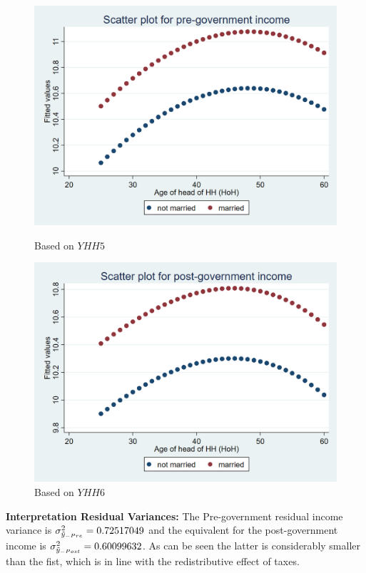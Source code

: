 \documentclass[12pt,a4paper]{article}
\begin{document}
\begin{figure}[h]
  \centering
  \begin{minipage}[b]{0.45\textwidth}
    \includegraphics[width=\textwidth]{stata_output/smoothed_yy5B_hat.png}
    \caption{Based on $YHH5$}
  \end{minipage}
  \hfill
  \begin{minipage}[b]{0.45\textwidth}
    \includegraphics[width=\textwidth]{stata_output/smoothed_yy6B_hat.png}
    \caption{Based on $YHH6$}
  \end{minipage}
\end{figure}

\textbf{Interpretation Residual Variances:} The Pre-government residual income variance is $\sigma^2_{\Tilde{y}_{-Pre}} = 0.72517049$ and the equivalent for the post-government income is $\sigma^2_{\Tilde{y}_{-Post}} = 0.60099632$. As can be seen the latter is considerably smaller than the fist, which is in line with the redistributive effect of taxes. 
\end{document}
